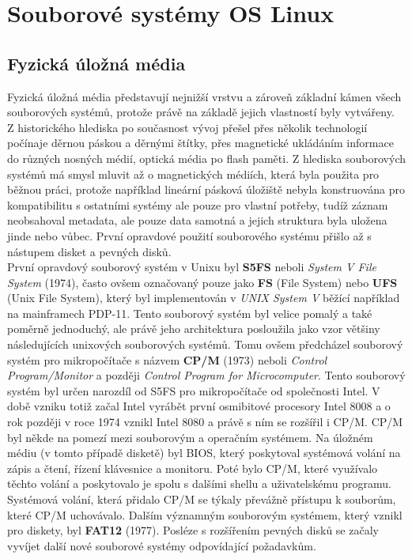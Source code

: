 \chapter{Souborové systémy OS Linux}

\section{Fyzická úložná média}
Fyzická úložná média představují nejnižší vrstvu  a zároveň základní kámen všech souborových systémů, protože právě na základě jejich vlastností byly vytvářeny.\\
Z historického hlediska po současnost vývoj přešel přes několik technologií počínaje děrnou páskou a děrnými štítky, přes magnetické ukládáním informace do různých nosných médií, optická média po flash paměti. Z hlediska souborových systémů má smysl mluvit až o magnetických médiích, která byla použita pro běžnou práci, protože například lineární pásková úložiště nebyla konstruována pro kompatibilitu s ostatními systémy ale pouze pro vlastní potřeby, tudíž záznam neobsahoval metadata, ale pouze data samotná a jejich struktura byla uložena jinde nebo vůbec. První opravdové použití souborového systému přišlo až s nástupem disket a pevných disků. \\
První opravdový souborový systém v Unixu byl \textbf{S5FS} neboli \emph{System V File System} (1974), často ovšem označovaný pouze jako \textbf{FS} (File System) nebo \textbf{UFS} (Unix File System), který byl implementován v \emph{UNIX System V} běžící například na mainframech PDP-11. Tento souborový systém byl velice pomalý a také poměrně jednoduchý, ale právě jeho architektura posloužila jako vzor většiny následujících unixových souborových systémů. Tomu ovšem předcházel souborový systém pro mikropočítače s názvem \textbf{CP/M} (1973) neboli \emph{Control Program/Monitor} a později \emph{Control Program for Microcomputer}. Tento souborový systém byl určen narozdíl od S5FS pro mikropočítače od společnosti Intel. V době vzniku totiž začal Intel vyrábět první osmibitové procesory Intel 8008 a o rok později v roce 1974 vznikl Intel 8080 a právě s ním se rozšířil i CP/M. CP/M byl někde na pomezí mezi souborovým a operačním systémem. Na úložném médiu (v tomto případě disketě) byl BIOS, který poskytoval systémová volání na zápis a čtení, řízení klávesnice a monitoru. Poté bylo CP/M, které využívalo těchto volání a poskytovalo je spolu s dalšími shellu a uživatelskému programu. Systémová volání, která přidalo CP/M se týkaly převážně přístupu k souborům, které CP/M uchovávalo. Dalším významným souborovým systémem, který vznikl pro diskety, byl \textbf{FAT12} (1977). Posléze s rozšířením pevných disků se začaly vyvíjet další nové souborové systémy odpovídající požadavkům.\\
